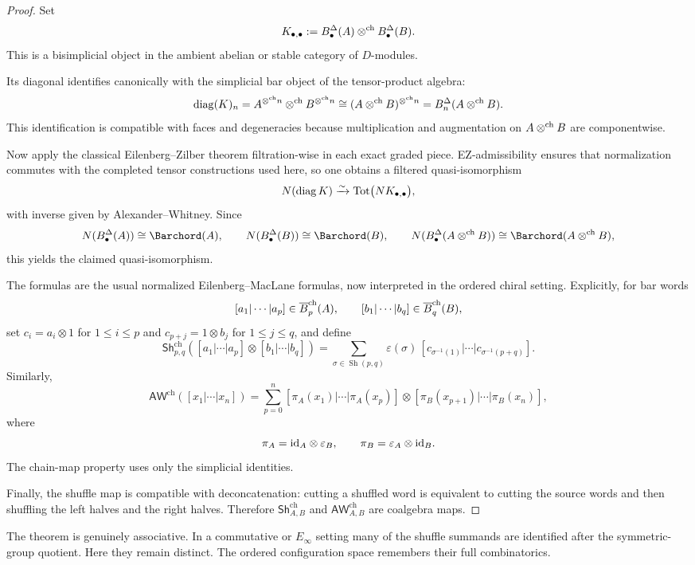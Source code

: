 \begin{proof}
Set
\[
K_{\bullet,\bullet}:=B^\Delta_\bullet(A)\mathbin{\otimes^{\mathrm{ch}}} B^\Delta_\bullet(B).
\]
This is a bisimplicial object in the ambient abelian or stable category of $D$-modules.

Its diagonal identifies canonically with the simplicial bar object of the tensor-product algebra:
\[
\operatorname{diag}(K)_n
=
A^{\mathbin{\otimes^{\mathrm{ch}}} n}\mathbin{\otimes^{\mathrm{ch}}} B^{\mathbin{\otimes^{\mathrm{ch}}} n}
\cong
(A\mathbin{\otimes^{\mathrm{ch}}} B)^{\mathbin{\otimes^{\mathrm{ch}}} n}
=
B^\Delta_n(A\mathbin{\otimes^{\mathrm{ch}}} B).
\]
This identification is compatible with faces and degeneracies because multiplication and augmentation
on $A\mathbin{\otimes^{\mathrm{ch}}} B$ are componentwise.

Now apply the classical Eilenberg--Zilber theorem filtration-wise in each exact graded piece.
EZ-admissibility ensures that normalization commutes with the completed tensor constructions used
here, so one obtains a filtered quasi-isomorphism
\[
N(\operatorname{diag}K)\xrightarrow{\sim} \operatorname{Tot}\bigl(NK_{\bullet,\bullet}\bigr),
\]
with inverse given by Alexander--Whitney. Since
\[
N(B^\Delta_\bullet(A))\cong \Barchord(A),
\qquad
N(B^\Delta_\bullet(B))\cong \Barchord(B),
\qquad
N(B^\Delta_\bullet(A\chotimes B))\cong \Barchord(A\chotimes B),
\]
this yields the claimed quasi-isomorphism.

The formulas are the usual normalized Eilenberg--MacLane formulas, now interpreted in the ordered
chiral setting. Explicitly, for bar words
\[
[a_1|\cdots|a_p]\in \overline{B}^{\mathrm{ch}}_p(A),\qquad [b_1|\cdots|b_q]\in \overline{B}^{\mathrm{ch}}_q(B),
\]
set $c_i=a_i\otimes 1$ for $1\leq i\leq p$ and $c_{p+j}=1\otimes b_j$ for $1\leq j\leq q$, and define
\[
\mathsf{Sh}^{\mathrm{ch}}_{p,q}
([a_1|\cdots|a_p]\otimes[b_1|\cdots|b_q])
=
\sum_{\sigma\in \operatorname{Sh}(p,q)}
\varepsilon(\sigma)\,
[c_{\sigma^{-1}(1)}|\cdots|c_{\sigma^{-1}(p+q)}].
\]
Similarly,
\[
\mathsf{AW}^{\mathrm{ch}}([x_1|\cdots|x_n])
=
\sum_{p=0}^n
[\pi_A(x_1)|\cdots|\pi_A(x_p)]\otimes[\pi_B(x_{p+1})|\cdots|\pi_B(x_n)],
\]
where
\[
\pi_A=\mathrm{id}_A\otimes \varepsilon_B,\qquad \pi_B=\varepsilon_A\otimes \mathrm{id}_B.
\]
The chain-map property uses only the simplicial identities.

Finally, the shuffle map is compatible with deconcatenation: cutting a shuffled word is equivalent to
cutting the source words and then shuffling the left halves and the right halves. Therefore
$\mathsf{Sh}^{\mathrm{ch}}_{A,B}$ and $\mathsf{AW}^{\mathrm{ch}}_{A,B}$ are coalgebra maps.
\end{proof}

\begin{remark}
The theorem is genuinely associative. In a commutative or $E_\infty$ setting many of the shuffle
summands are identified after the symmetric-group quotient. Here they remain distinct. The ordered
configuration space remembers their full combinatorics.
\end{remark}

